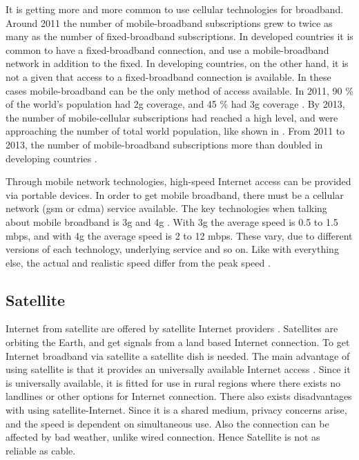 It is getting more and more common to use cellular technologies for broadband. Around 2011 the number of mobile-broadband subscriptions grew to twice as many as the number of fixed-broadband subscriptions. In developed countries it is common to have a fixed-broadband connection, and use a mobile-broadband network in addition to the fixed. In developing countries, on the other hand, it is not a given that access to a fixed-broadband connection is available. In these cases mobile-broadband can be the only method of access available. In 2011, 90 \% of the world's population had \gls{2g} coverage, and 45 \% had \gls{3g} coverage \cite{itu2011}. By 2013, the number of mobile-cellular subscriptions had reached a high level, and were approaching the number of total world population, like shown in . From 2011 to 2013, the number of mobile-broadband  subscriptions more than doubled in developing countries \cite{itu2013}. 

Through mobile network technologies, high-speed Internet access can be provided via portable devices. In order to get mobile broadband, there must be a cellular network (\gls{gsm} or \gls{cdma}) service available. The key technologies when talking about mobile broadband is \gls{3g} and \gls{4g} \cite{mobilebroadband}. With \gls{3g} the average speed is 0.5 to 1.5 \gls{mbps}, and with \gls{4g} the average speed is 2 to 12 \gls{mbps}. These vary, due to different versions of each technology, underlying service and so on. Like with everything else, the actual and realistic speed differ from the peak speed \cite{3gvs4g}. 


\subsection{Satellite}
Internet from satellite are offered by satellite Internet providers \cite{cablevssatellite}. Satellites are orbiting the Earth, and get signals from a land based Internet connection. To get Internet broadband via satellite a satellite dish is needed. The main advantage of using satellite is that it provides an universally available Internet access \cite{broadband}. Since it is universally available, it is fitted for use in rural regions where there exists no landlines or other options for Internet connection. There also exists disadvantages with using satellite-Internet. Since it is a shared medium, privacy concerns arise, and the speed is dependent on simultaneous use. Also the connection can be affected by bad weather, unlike wired connection. Hence Satellite is not as reliable as cable. 



